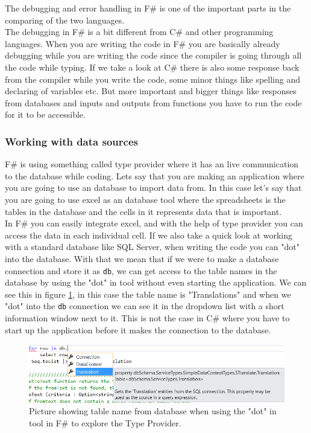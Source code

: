 \documentclass[12pt, a4paper]{article}
\newcommand{\code}[1]{{\small \texttt{#1}}}
\begin{document}
The debugging and error handling in F\# is one of the important parts in the comparing of the two languages.\\

The debugging in F\# is a bit different from C\# and other programming languages. When you are writing the code in F\# you are basically already debugging while you are writing the code since the compiler is going through all the code while typing. If we take a look at C\# there is also some response back from the compiler while you write the code, some minor things like spelling and declaring of variables etc. But more important and bigger things like responses from databases and inputs and outputs from functions you have to run the code for it to be accessible.


\newpage
\subsubsection{Working with data sources}

F\# is using something called type provider where it has an live communication to the database while coding. Lets say that you are making an application where you are going to use an database to import data from. In this case let's say that you are going to use excel as an database tool where the spreadsheets is the tables in the database and the cells in it represents data that is important. \\

In F\# you can easily integrate excel, and with the help of type provider you can access the data in each individual cell. If we also take a quick look at working with a standard database like SQL Server, when writing the code you can "dot" into the database. With that we mean that if we were to make a database connection and store it as \code{db}, we can get access to the table names in the database by using the "dot" in tool without even starting the application. We can see this in figure \ref{fig:DotInTool}, in this case the table name is "Translations" and when we "dot" into the \code{db} connection we can see it in the dropdown list with a short information window next to it. This is not the case in C\# where you have to start up the application before it makes the connection to the database.


\begin{figure}[!h]
    \includegraphics[width=\textwidth]{visualstudio1}
    \centering
    \caption{Picture showing table name from database when using the "dot" in tool in F\# to explore the Type Provider.}
    \label{fig:DotInTool}
\end{figure}
\end{document}
